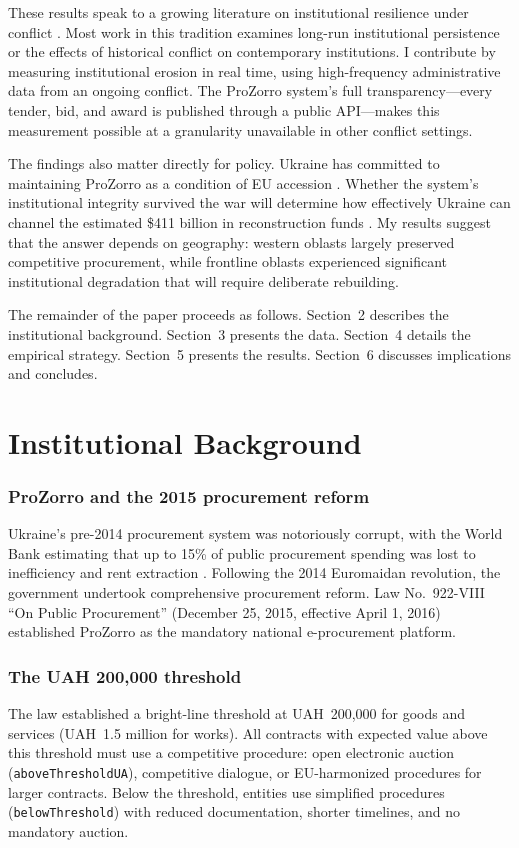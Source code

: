 \documentclass[12pt]{article}
\begin{document}
These results speak to a growing literature on institutional resilience under conflict \citep{Besley2010, Acemoglu2019, Dell2018}. Most work in this tradition examines long-run institutional persistence or the effects of historical conflict on contemporary institutions. I contribute by measuring institutional erosion in real time, using high-frequency administrative data from an ongoing conflict. The ProZorro system's full transparency---every tender, bid, and award is published through a public API---makes this measurement possible at a granularity unavailable in other conflict settings.

The findings also matter directly for policy. Ukraine has committed to maintaining ProZorro as a condition of EU accession \citep{EU2022}. Whether the system's institutional integrity survived the war will determine how effectively Ukraine can channel the estimated \$411 billion in reconstruction funds \citep{WorldBank2024}. My results suggest that the answer depends on geography: western oblasts largely preserved competitive procurement, while frontline oblasts experienced significant institutional degradation that will require deliberate rebuilding.

The remainder of the paper proceeds as follows. Section~2 describes the institutional background. Section~3 presents the data. Section~4 details the empirical strategy. Section~5 presents the results. Section~6 discusses implications and concludes.


\section{Institutional Background}

\subsubsection*{ProZorro and the 2015 procurement reform} Ukraine's pre-2014 procurement system was notoriously corrupt, with the World Bank estimating that up to 15\% of public procurement spending was lost to inefficiency and rent extraction \citep{WorldBank2016}. Following the 2014 Euromaidan revolution, the government undertook comprehensive procurement reform. Law No.~922-VIII ``On Public Procurement'' (December 25, 2015, effective April 1, 2016) established ProZorro as the mandatory national e-procurement platform.

\subsubsection*{The UAH 200,000 threshold} The law established a bright-line threshold at UAH~200,000 for goods and services (UAH~1.5 million for works). All contracts with expected value above this threshold must use a competitive procedure: open electronic auction (\texttt{aboveThresholdUA}), competitive dialogue, or EU-harmonized procedures for larger contracts. Below the threshold, entities use simplified procedures (\texttt{belowThreshold}) with reduced documentation, shorter timelines, and no mandatory auction.
\end{document}
